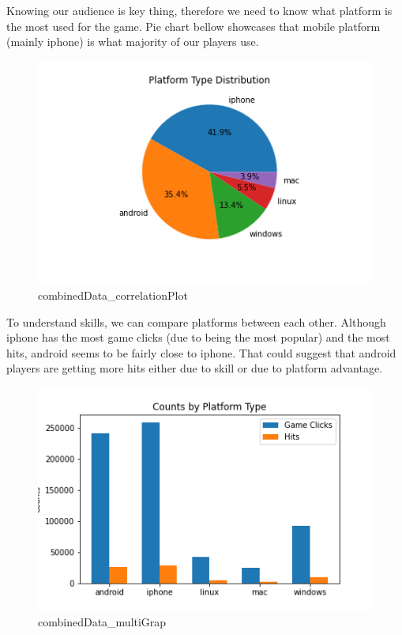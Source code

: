 Knowing our audience is key thing, therefore we need to know what platform is the most used for the game. Pie chart bellow showcases that mobile platform (mainly iphone) is what majority of our players use.
\begin{figure}[H]
\includegraphics[scale=0.85]{img/Graphs/combinedData/correlationPlot_combinedData.png}
\centering
\caption{combinedData\_correlationPlot}
\label{fig:combinedData_correlationPlot}
\end{figure}

To understand skills, we can compare platforms between each other. Although iphone has the most game clicks (due to being the most popular) and the most hits, android seems to be fairly close to iphone. That could suggest that android players are getting more hits either due to skill or due to platform advantage.
\begin{figure}[H]
\includegraphics[scale=0.85]{img/Graphs/combinedData/multiGrap_combinedData.png}
\centering
\caption{combinedData\_multiGrap}
\label{fig:combinedData_multiGrap}
\end{figure}

